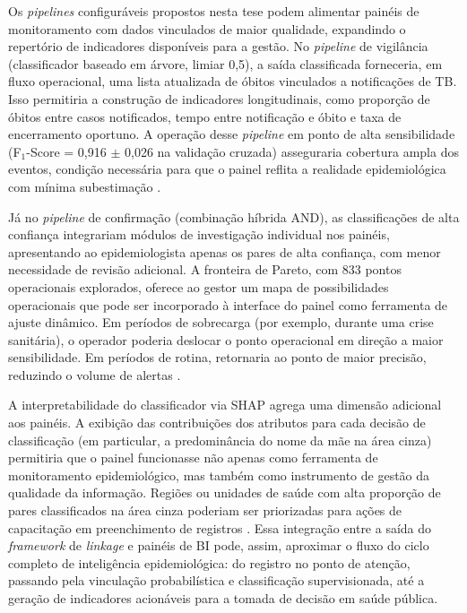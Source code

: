 Os \textit{pipelines} configuráveis propostos nesta tese podem alimentar painéis de monitoramento com dados vinculados de maior qualidade, expandindo o repertório de indicadores disponíveis para a gestão. No \textit{pipeline} de vigilância (classificador baseado em árvore, limiar 0,5), a saída classificada forneceria, em fluxo operacional, uma lista atualizada de óbitos vinculados a notificações de TB. Isso permitiria a construção de indicadores longitudinais, como proporção de óbitos entre casos notificados, tempo entre notificação e óbito e taxa de encerramento oportuno. A operação desse \textit{pipeline} em ponto de alta sensibilidade (F$_1$-Score = 0,916 $\pm$ 0,026 na validação cruzada) asseguraria cobertura ampla dos eventos, condição necessária para que o painel reflita a realidade epidemiológica com mínima subestimação \cite{Bartholomay2014improved}.

Já no \textit{pipeline} de confirmação (combinação híbrida AND), as classificações de alta confiança integrariam módulos de investigação individual nos painéis, apresentando ao epidemiologista apenas os pares de alta confiança, com menor necessidade de revisão adicional. A fronteira de Pareto, com 833 pontos operacionais explorados, oferece ao gestor um mapa de possibilidades operacionais que pode ser incorporado à interface do painel como ferramenta de ajuste dinâmico. Em períodos de sobrecarga (por exemplo, durante uma crise sanitária), o operador poderia deslocar o ponto operacional em direção a maior sensibilidade. Em períodos de rotina, retornaria ao ponto de maior precisão, reduzindo o volume de alertas \cite{Harron2017linkagequality}.

A interpretabilidade do classificador via SHAP agrega uma dimensão adicional aos painéis. A exibição das contribuições dos atributos para cada decisão de classificação (em particular, a predominância do nome da mãe na área cinza) permitiria que o painel funcionasse não apenas como ferramenta de monitoramento epidemiológico, mas também como instrumento de gestão da qualidade da informação. Regiões ou unidades de saúde com alta proporção de pares classificados na área cinza poderiam ser priorizadas para ações de capacitação em preenchimento de registros \cite{Lundberg2020treeshap, Markus2021role}. Essa integração entre a saída do \textit{framework} de \textit{linkage} e painéis de BI pode, assim, aproximar o fluxo do ciclo completo de inteligência epidemiológica: do registro no ponto de atenção, passando pela vinculação probabilística e classificação supervisionada, até a geração de indicadores acionáveis para a tomada de decisão em saúde pública.
